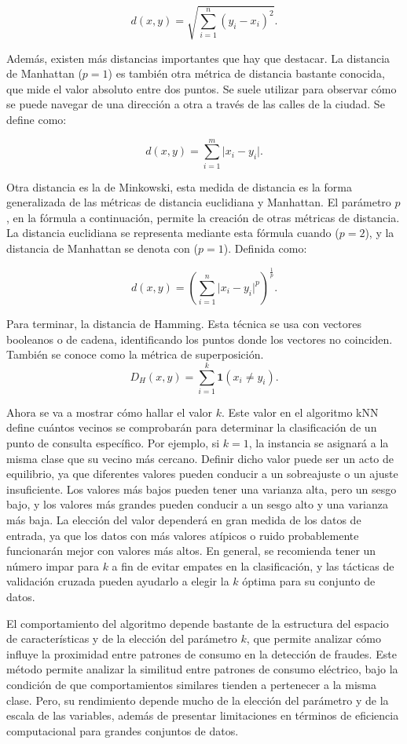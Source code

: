 \documentclass[12pt,a4paper]{report}
\begin{document}
\[d(x,y) = \sqrt{\sum_{i=1}^{n} (y_i - x_i)^2} .\]

Además, existen más distancias importantes que hay que destacar. La distancia de Manhattan ($p=1$) es también otra métrica de distancia bastante conocida, que mide el valor absoluto entre dos puntos. Se suele utilizar para observar cómo se puede navegar de una dirección a otra a través de las calles de la ciudad. Se define como:

\[d(x,y) = \sum_{i=1}^{m} \lvert x_i - y_i \rvert .\]

Otra distancia es la de Minkowski, esta medida de distancia es la forma generalizada de las métricas de distancia euclidiana y Manhattan. El parámetro $p$, en la fórmula a continuación, permite la creación de otras métricas de distancia. La distancia euclidiana se representa mediante esta fórmula cuando ($p=2$), y la distancia de Manhattan se denota con ($p=1$). Definida como:

\[d(x,y) = \left( \sum_{i=1}^{n} \lvert x_i - y_i \rvert^p \right)^{\frac{1}{p}} .\]

Para terminar, la distancia de Hamming. Esta técnica se usa con vectores booleanos o de cadena, identificando los puntos donde los vectores no coinciden. También se conoce como la métrica de superposición.
\[D_H(x,y) = \sum_{i=1}^{k} \mathbf{1}(x_i \ne y_i) .\]

Ahora se va a mostrar cómo hallar el valor $k$. Este valor en el algoritmo kNN define cuántos vecinos se comprobarán para determinar la clasificación de un punto de consulta específico. Por ejemplo, si $k=1$, la instancia se asignará a la misma clase que su vecino más cercano. Definir dicho valor puede ser un acto de equilibrio, ya que diferentes valores pueden conducir a un sobreajuste o un ajuste insuficiente. Los valores más bajos pueden tener una varianza alta, pero un sesgo bajo, y los valores más grandes pueden conducir a un sesgo alto y una varianza más baja. La elección del valor dependerá en gran medida de los datos de entrada, ya que los datos con más valores atípicos o ruido probablemente funcionarán mejor con valores más altos. En general, se recomienda tener un número impar para $k$ a fin de evitar empates en la clasificación, y las tácticas de validación cruzada pueden ayudarlo a elegir la $k$ óptima para su conjunto de datos.

El comportamiento del algoritmo depende bastante de la estructura del espacio de características y de la elección del parámetro $k$, que permite analizar cómo influye la proximidad entre patrones de consumo en la detección de fraudes. Este método permite analizar la similitud entre patrones de consumo eléctrico, bajo la condición de que comportamientos similares tienden a pertenecer a la misma clase. Pero, su rendimiento depende mucho de la elección del parámetro y de la escala de las variables, además de presentar limitaciones en términos de eficiencia computacional para grandes conjuntos de datos.
\end{document}
